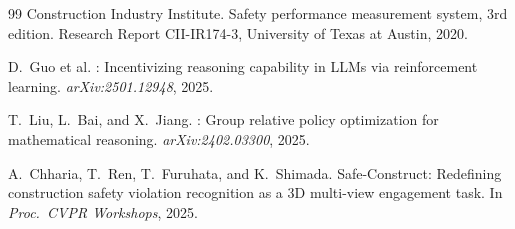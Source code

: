 \documentclass[sigconf,nonacm]{acmart}
\begin{document}
\begin{thebibliography}{99}
{Construction Industry Institute}.
\newblock Safety performance measurement system, 3rd edition.
\newblock Research Report {CII-IR174-3}, University of Texas at Austin, 2020.

D.~Guo et al.
: Incentivizing reasoning capability in {LLMs} via
  reinforcement learning.
\newblock \emph{arXiv:2501.12948}, 2025.

T.~Liu, L.~Bai, and X.~Jiang.
: Group relative policy optimization for mathematical
  reasoning.
\newblock \emph{arXiv:2402.03300}, 2025.

A.~Chharia, T.~Ren, T.~Furuhata, and K.~Shimada.
\newblock Safe-Construct: Redefining construction safety violation recognition
  as a 3D multi-view engagement task.
\newblock In \emph{Proc.\ CVPR Workshops}, 2025.

\end{thebibliography}
\end{document}
